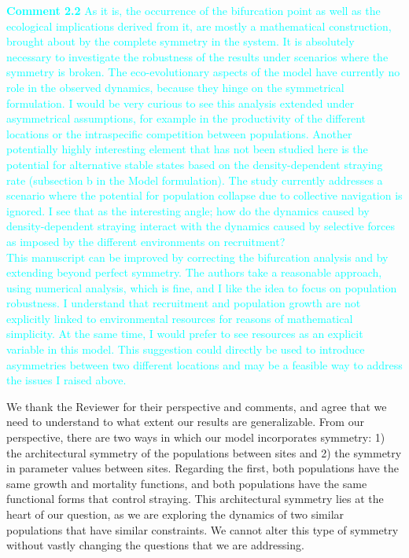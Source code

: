 \documentclass[ucm,12pt]{ucletter}
\newcounter{section}
\newcounter{subsection}[section]
\begin{document}
\begin{letter}
\noindent \textcolor{cyan}{
{\bf Comment 2.2} As it is, the occurrence of the bifurcation point as well as the ecological implications derived from it, are mostly a mathematical construction, brought about by the complete symmetry in the system. It is absolutely necessary to investigate the robustness of the results under scenarios where the symmetry is broken. The eco-evolutionary aspects of the model have currently no role in the observed dynamics, because they hinge on the symmetrical formulation.
I would be very curious to see this analysis extended under asymmetrical assumptions, for example in the productivity of the different locations or the intraspecific competition between populations. Another potentially highly interesting element that has not been studied here is the potential for alternative stable states based on the density-dependent straying rate (subsection b in the Model formulation). The study currently addresses a scenario where the potential for population collapse due to collective navigation is ignored. I see that as the interesting angle; how do the dynamics caused by density-dependent straying interact with the dynamics caused by selective forces as imposed by the different environments on recruitment?
\\
This manuscript can be improved by correcting the bifurcation analysis and by extending beyond perfect symmetry. The authors take a reasonable approach, using numerical analysis, which is fine, and I like the idea to focus on population robustness.  I understand that recruitment and population growth are not explicitly linked to environmental resources for reasons of mathematical simplicity. At the same time, I would prefer to see resources as an explicit variable in this model. This suggestion could directly be used to introduce asymmetries between two different locations and may be a feasible way to address the issues I raised above.
}

 We thank the Reviewer for their perspective and comments, and agree that we need to understand to what extent our results are generalizable.
From our perspective, there are two ways in which our model incorporates symmetry: 1) the architectural symmetry of the populations between sites and 2) the symmetry in parameter values between sites. Regarding the first, both populations have the same growth and mortality functions, and both populations have the same functional forms that control straying. This architectural symmetry lies at the heart of our question, as we are exploring the dynamics of two similar populations that have similar constraints. We cannot alter this type of symmetry without vastly changing the questions that we are addressing.


\end{letter}
\end{document}
